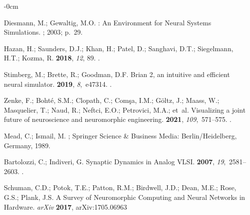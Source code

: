 \documentclass[brainsci, %
               review,accept,pdftex,moreauthors
               ]{Definitions/mdpi}
\begin{document}
\begin{adjustwidth}{-\extralength}{0cm}
\begin{thebibliography}{999}
Diesmann, M.; Gewaltig, M.O.
: {An} {Environment} for {Neural} {Systems} {Simulations}.
; {
  {2003}}; %
 p.~29.

Hazan, H.; Saunders, D.J.; Khan, H.; Patel, D.; Sanghavi, D.T.; Siegelmann,
  H.T.; Kozma, R.
\newblock {}
 {\bf 2018}, {\em 12}, 89.
.

Stimberg, M.; Brette, R.; Goodman, D.F.
\newblock Brian 2, an intuitive and efficient neural simulator.
 {\bf 2019}, {\em 8},~e47314.
.

Zenke, F.; Bohté, S.M.; Clopath, C.; Comşa, I.M.; Göltz, J.; Maass, W.;
  Masquelier, T.; Naud, R.; Neftci, E.O.; Petrovici, M.A.;  et~al.
\newblock Visualizing a joint future of neuroscience and neuromorphic
  engineering.
 {\bf 2021}, {\em 109},~571--575.
.

Mead, C.; Ismail, M.
; Springer
  Science \& Business Media:  {Berlin/Heidelberg, Germany,} %
  1989.

Bartolozzi, C.; Indiveri, G.
\newblock Synaptic {Dynamics} in {Analog} {VLSI}.
 {\bf 2007}, {\em 19},~2581--2603.\linebreak
{}.

Schuman, C.D.; Potok, T.E.; Patton, R.M.; Birdwell, J.D.; Dean, M.E.; Rose,
  G.S.; Plank, J.S.
\newblock A {Survey} of {Neuromorphic} {Computing} and {Neural} {Networks} in
  {Hardware}. \emph{arXiv} {\bf 2017}, arXiv:1705.06963


\end{thebibliography}
\end{adjustwidth}
\end{document}
